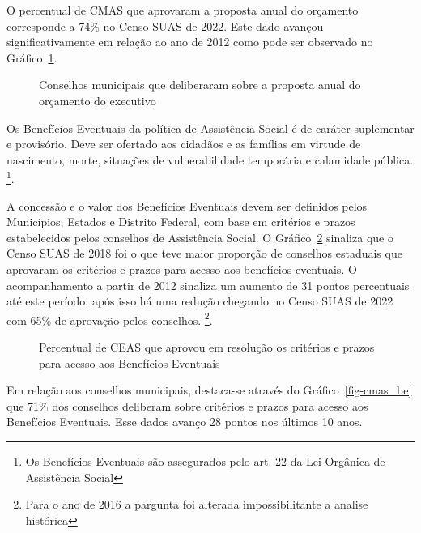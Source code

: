 \documentclass[
  letterpaper,
  DIV=11,
  numbers=noendperiod]{scrreprt}
\begin{document}
O percentual de CMAS que aprovaram a proposta anual do orçamento
corresponde a 74\% no Censo SUAS de 2022. Este dado avançou
significativamente em relação ao ano de 2012 como pode ser observado no
Gráfico~\ref{fig-cmas_ppa}.

\begin{figure}


\caption{\label{fig-cmas_ppa}Conselhos municipais que deliberaram sobre
a proposta anual do orçamento do executivo}

\end{figure}%

Os Benefícios Eventuais da política de Assistência Social é de caráter
suplementar e provisório. Deve ser ofertado aos cidadãos e as famílias
em virtude de nascimento, morte, situações de vulnerabilidade temporária
e calamidade pública. \footnote{Os Benefícios Eventuais são assegurados
  pelo art. 22 da Lei Orgânica de Assistência Social}.

A concessão e o valor dos Benefícios Eventuais devem ser definidos pelos
Municípios, Estados e Distrito Federal, com base em critérios e prazos
estabelecidos pelos conselhos de Assistência Social. O
Gráfico~\ref{fig-ceas_be} sinaliza que o Censo SUAS de 2018 foi o que
teve maior proporção de conselhos estaduais que aprovaram os critérios e
prazos para acesso aos benefícios eventuais. O acompanhamento a partir
de 2012 sinaliza um aumento de 31 pontos percentuais até este período,
após isso há uma redução chegando no Censo SUAS de 2022 com 65\% de
aprovação pelos conselhos. \footnote{Para o ano de 2016 a pargunta foi
  alterada impossibilitante a analise histórica}.

\begin{figure}


\caption{\label{fig-ceas_be}Percentual de CEAS que aprovou em resolução
os critérios e prazos para acesso aos Benefícios Eventuais}

\end{figure}%

Em relação aos conselhos municipais, destaca-se através do
Gráfico~\ref{fig-cmas_be} que 71\% dos conselhos deliberam sobre
critérios e prazos para acesso aos Benefícios Eventuais. Esse dados
avanço 28 pontos nos últimos 10 anos.
\end{document}
